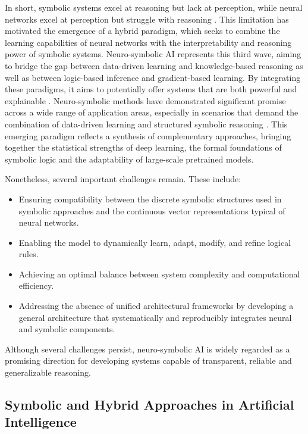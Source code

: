 \documentclass[12pt,a4paper]{report}
\begin{document}
In short, symbolic systems excel at reasoning but lack at perception, while neural networks excel at perception but struggle with reasoning  \cite{chiave16}.
This limitation has motivated the emergence of a hybrid paradigm, which seeks to combine the learning capabilities of neural networks with the interpretability and reasoning power of symbolic systems. Neuro-symbolic AI represents this third wave, aiming to bridge the gap between data-driven learning and knowledge-based reasoning as well as between logic-based inference and gradient-based learning. By integrating these paradigms, it aims to potentially offer systems that are both powerful and 
explainable  \cite{chiave43}.
Neuro-symbolic methods have demonstrated significant promise across a wide range of application areas, especially in scenarios that demand the combination of data-driven learning and structured symbolic reasoning  \cite{chiave43}. This emerging paradigm reflects a 
synthesis of complementary approaches, bringing together the statistical strengths of deep learning, the formal foundations of symbolic logic and the adaptability of large-scale pretrained models.


\noindent Nonetheless, several important challenges remain. These include:
\begin{itemize}
    \item Ensuring compatibility between the discrete symbolic structures used in symbolic approaches and the continuous vector representations typical of neural networks.
    \item Enabling the model to dynamically learn, adapt, modify, and refine logical rules.
    \item Achieving an optimal balance between system complexity and computational efficiency.
    \item Addressing the absence of unified architectural frameworks by developing a general architecture that systematically and reproducibly integrates neural and symbolic components.
\end{itemize}

Although several challenges persist, neuro-symbolic AI is widely regarded as a promising direction for developing systems capable of transparent, reliable and generalizable reasoning.


\subsection{Symbolic and Hybrid Approaches in Artificial Intelligence}
\end{document}
